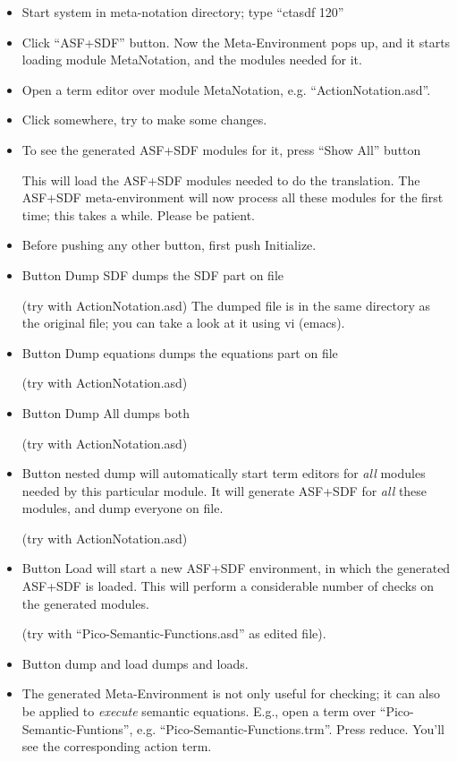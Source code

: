  \begin{itemize}  
 \item{} 
   Start system in meta-notation directory; type ``ctasdf 120''
  \item
    Click ``ASF+SDF'' button.
    Now the Meta-Environment pops up, and it starts loading
    module MetaNotation, and the modules needed for it.
  \item
    Open a term editor over module MetaNotation,
    e.g. ``ActionNotation.asd''.
  \item
    Click somewhere, try to make some changes.
  \item
    To see the generated ASF+SDF modules for it, press ``Show All''
    button

    This will load the ASF+SDF modules needed to do the translation.
    The ASF+SDF meta-environment will now process all these modules
    for the first time; this takes a while. Please be patient.

  \item
    Before pushing any other button, first push Initialize.

  \item
    Button Dump SDF dumps the SDF part on file

    (try with ActionNotation.asd) The dumped file is in the same directory 
    as the original file; you can take a look at it using vi (emacs).

  \item
    Button Dump equations dumps the equations part on file

   (try with ActionNotation.asd)
  \item 
    Button Dump All dumps both

   (try with ActionNotation.asd)

  \item
    Button nested dump will automatically start term editors
    for {\em all\/} modules needed by this particular module.
    It will generate ASF+SDF for {\em all\/} these modules, and
    dump everyone on file.

    (try with ActionNotation.asd)

  \item
    Button Load will start a new ASF+SDF environment, in which
    the generated ASF+SDF is loaded.
    This will perform a considerable number of checks on the
    generated modules.
    
    (try with ``Pico-Semantic-Functions.asd'' as edited file).

  \item
    Button dump and load dumps and loads.

  \item
    The generated Meta-Environment is not only useful for checking;
    it can also be applied to {\em execute\/} semantic equations.
    E.g., open a term over ``Pico-Semantic-Funtions'', e.g.
    ``Pico-Semantic-Functions.trm''.
    Press reduce.
    You'll see the corresponding action term.

 \end{itemize}
  







